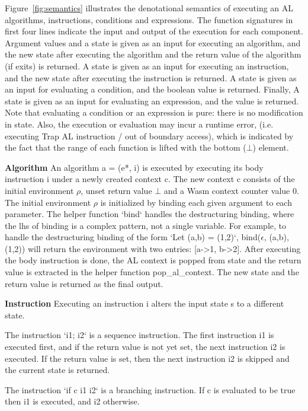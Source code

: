 Figure~\ref{fig:semantics} illustrates the denotational semantics of executing an AL algorithms, instructions,
conditions and expressions. The function signatures in first four lines
indicate the input and output of the execution for each component.
Argument values and a state is given as an input for executing an algorithm,
and the new state after executing the algorithm and the return value of the algorithm (if exits) is returned.
A state is given as an input for executing an instruction,
and the new state after executing the instruction is returned.
A state is given as an input for evaluating a condition, and the boolean value is returned.
Finally, A state is given as an input for evaluating an expression, and the value is returned.
Note that evaluating a condition or an expression is pure: there is no modification in state.
Also, the execution or evaluation may incur a runtime error, (i.e. executing Trap AL instruction
/ out of boundary access), which is indicated by the fact that the range of each function
is lifted with the bottom ($\bot$) element.

\textbf{Algorithm}
An algorithm a = (e*, i) is executed by executing its body instruction i under a newly created context c.
The new context c consists of the initial environment $\rho$, unset return value $\bot$ and a
Wasm context counter value 0. The initial environment $\rho$ is initialized by binding
each given argument to each parameter. The helper function `bind` handles the
destructuring binding, where the lhs of binding is a complex pattern, not a single variable.
For example, to handle the destructuring binding of the form `Let (a,b) = (1,2)`,
bind($\epsilon$, (a,b), (1,2)) will return the environment with two entries: [a->1, b->2].
After executing the body instruction is done, the AL context is popped from state and
the return value is extracted in the helper function pop\_al\_context. The new state
and the return value is returned as the final output.

\textbf{Instruction}
Executing an instruction i alters the input state s to a different state.

The instruction `i1; i2` is a sequence instruction. The first instruction
i1 is executed first, and if the return value is not yet set, the next instruction
i2 is executed. If the return value is set, then the next instruction i2 is skipped and
the current state is returned.

The instruction `if c i1 i2` is a branching instruction. If c is evaluated to be true then
i1 is executed, and i2 otherwise.


